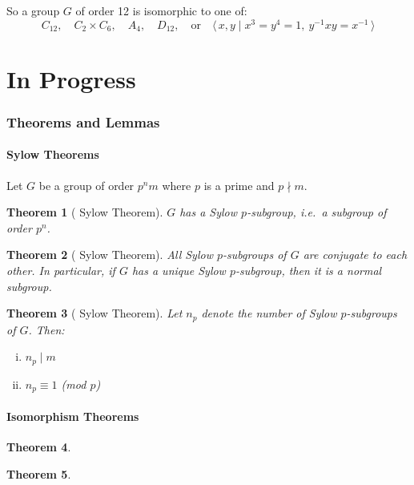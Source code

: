 \documentclass[a4paper, oneside, 12pt, final]{article}
\newtheorem{theorem}{Theorem}[section]
\theoremstyle{definition}
\begin{document}
So a group \(G\) of order 12 is isomorphic to one of:
\[
    C_{12}, \quad%
    C_2 \times C_6, \quad%
    A_4, \quad%
    D_{12}, \quad \text{or} \quad%
    \langle\, x, y \mid x^3 = y^4 = 1,\ y^{-1}xy = x^{-1}\,\rangle
\]


\part{In Progress}

\section{Theorems and Lemmas}
\subsection{Sylow Theorems}
Let \(G\) be a group of order \(p^n m\) where \(p\) is a prime and \(p\nmid m\).
\begin{theorem}[ Sylow Theorem]\label{thm:sylow1}
    \(G\) has a Sylow \(p\)-subgroup, i.e.\ a subgroup of order \(p^n\).
\end{theorem}
\begin{theorem}[ Sylow Theorem]\label{thm:sylow2}
    All Sylow \(p\)-subgroups of \(G\) are conjugate to each other.
    In particular, if \(G\) has a unique Sylow \(p\)-subgroup, then it is a normal subgroup.
\end{theorem}
\begin{theorem}[ Sylow Theorem]\label{thm:sylow3}
    Let \(n_p\) denote the number of Sylow \(p\)-subgroups of \(G\).
    Then:
    \begin{enumerate}[(i)]
        \item \(n_p \mid m\)
        \item \(n_p\equiv 1\) (mod \(p\))
    \end{enumerate}
\end{theorem}

\subsection{Isomorphism Theorems}
\begin{theorem}\label{thm:iso1}
\end{theorem}

\begin{theorem}\label{thm:iso2}
\end{theorem}
\end{document}
